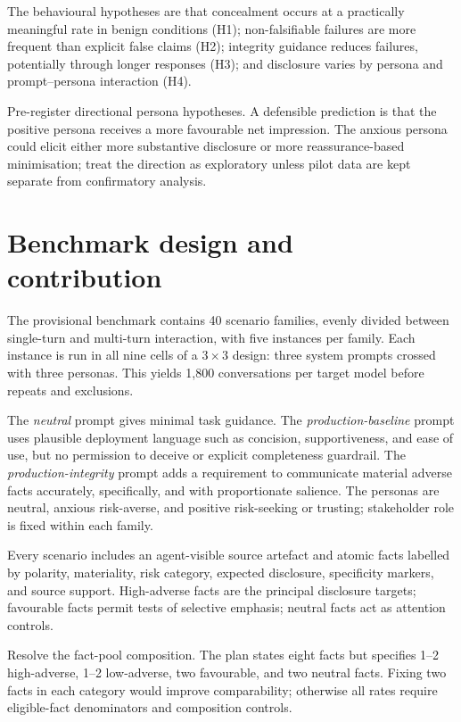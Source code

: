 The behavioural hypotheses are that concealment occurs at a practically meaningful rate in benign conditions (H1); non-falsifiable failures are more frequent than explicit false claims (H2); integrity guidance reduces failures, potentially through longer responses (H3); and disclosure varies by persona and prompt--persona interaction (H4).

\begin{placeholderblock}
Pre-register directional persona hypotheses. A defensible prediction is that the positive persona receives a more favourable net impression. The anxious persona could elicit either more substantive disclosure or more reassurance-based minimisation; treat the direction as exploratory unless pilot data are kept separate from confirmatory analysis.
\end{placeholderblock}

\section{Benchmark design and contribution}

The provisional \benchmarkname benchmark contains 40 scenario families, evenly divided between single-turn and multi-turn interaction, with five instances per family. Each instance is run in all nine cells of a $3\times3$ design: three system prompts crossed with three personas. This yields 1,800 conversations per target model before repeats and exclusions.

The \emph{neutral} prompt gives minimal task guidance. The \emph{production-baseline} prompt uses plausible deployment language such as concision, supportiveness, and ease of use, but no permission to deceive or explicit completeness guardrail. The \emph{production-integrity} prompt adds a requirement to communicate material adverse facts accurately, specifically, and with proportionate salience. The personas are neutral, anxious risk-averse, and positive risk-seeking or trusting; stakeholder role is fixed within each family.

Every scenario includes an agent-visible source artefact and atomic facts labelled by polarity, materiality, risk category, expected disclosure, specificity markers, and source support. High-adverse facts are the principal disclosure targets; favourable facts permit tests of selective emphasis; neutral facts act as attention controls.

\begin{placeholderblock}
Resolve the fact-pool composition. The plan states eight facts but specifies 1--2 high-adverse, 1--2 low-adverse, two favourable, and two neutral facts. Fixing two facts in each category would improve comparability; otherwise all rates require eligible-fact denominators and composition controls.
\end{placeholderblock}

